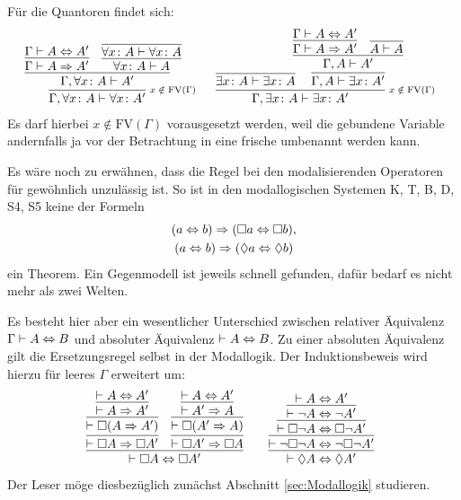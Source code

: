 \begin{Beweis}
Für die Quantoren findet sich:
\[
\begin{array}{@{}l@{\quad\;\;}l}
\infer[\infernote{$x\notin\mathrm{FV}(\Gamma)$}]{\Gamma,\forall x\colon A\vdash\forall x\colon A'}{
  \infer{\Gamma,\forall x\colon A\vdash A'}{
    \infer{\Gamma\vdash A\cond A'}{\Gamma\vdash A\bicond A'}
  & \infer{\forall x\colon A\vdash A}{
      \infer{\forall x\colon A\vdash\forall x\colon A}{}}}}
&
\infer[\infernote{$x\notin\mathrm{FV}(\Gamma)$}]{\Gamma,\exists x\colon A\vdash\exists x\colon A'}{
  \infer{\exists x\colon A\vdash\exists x\colon A}{}\hspace{-12pt}
& \infer{\Gamma, A\vdash\exists x\colon A'}{
    \infer{\Gamma, A\vdash A'}{
      \infer{\Gamma\vdash A\cond A'}{
        \Gamma\vdash A\bicond A'}
    & \infer{A\vdash A}{}}}}
\end{array}
\]
Es darf hierbei $x\notin\mathrm{FV}(\Gamma)$ vorausgesetzt werden, weil
die gebundene Variable andernfalls ja vor der Betrachtung in eine
frische umbenannt werden kann.\,\qedsymbol
\end{Beweis}

\noindent
Es wäre noch zu erwähnen, dass die Regel bei den modalisierenden
Operatoren für gewöhnlich unzulässig ist. So ist in den modallogischen
Systemen K, T, B, D, S4, S5 keine der Formeln
\begin{gather*}
(a\Leftrightarrow b)\Rightarrow (\Box a\Leftrightarrow\Box b),\\
(a\Leftrightarrow b)\Rightarrow (\Diamond a\Leftrightarrow\Diamond b)
\end{gather*}
ein Theorem. Ein Gegenmodell ist jeweils schnell gefunden, dafür
bedarf es nicht mehr als zwei Welten.

Es besteht hier aber ein wesentlicher Unterschied zwischen relativer
Äquivalenz $\Gamma\vdash A\Leftrightarrow B$ und absoluter Äquivalenz
$\vdash A\Leftrightarrow B$. Zu einer absoluten Äquivalenz gilt die Ersetzungsregel
selbst in der Modallogik. Der Induktionsbeweis wird hierzu für leeres
$\Gamma$ erweitert um:
\[
\begin{array}{@{}l@{\qquad}l}
\infer{\vdash\lnec A\bicond\lnec A'}{
  \infer{\vdash\lnec A\cond\lnec A'}{
    \infer{\vdash\lnec(A\cond A')}{
      \infer{\vdash A\cond A'}{\vdash A\bicond A'}}}
& \infer{\vdash\lnec A'\cond\lnec A}{
    \infer{\vdash\lnec(A'\cond A)}{
      \infer{\vdash A'\cond A}{\vdash A\bicond A'}}}}
&
\infer{\vdash\lpos A\bicond\lpos A'}{
  \infer{\vdash\lnot\lnec\lnot A\bicond\lnot\lnec\lnot A'}{
    \infer{\vdash\lnec\lnot A\bicond\lnec\lnot A'}{
      \infer{\vdash\lnot A\bicond\lnot A'}{
        \vdash A\bicond A'}}}}
\end{array}
\]
Der Leser möge diesbezüglich zunächst Abschnitt \ref{sec:Modallogik} studieren.

